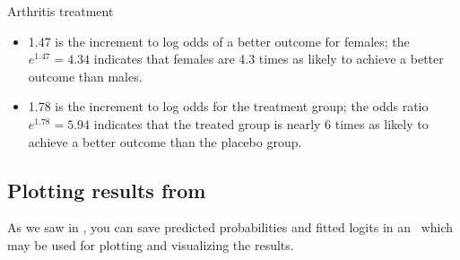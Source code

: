 \begin{Example}[arthrit8]{Arthritis treatment}
\begin{itemize}

\item 1.47 is the increment to log odds of a better outcome for
       females; the  \(e^{1.47} = 4.34\) indicates that
       females are 4.3 times as likely to achieve a better outcome
       than males.

\item 1.78 is the increment to log odds for the treatment group; the
       odds ratio \(e^{1.78} = 5.94\) indicates that the treated
       group is nearly 6 times as likely to achieve a better outcome
       than the placebo group.

\end{itemize}
\end{Example}

\subsection{Plotting results from }\label{sec:qual-plots}
As we saw in , you can save predicted probabilities and fitted logits in an
\ODS\ which may be used for plotting and visualizing the results.

